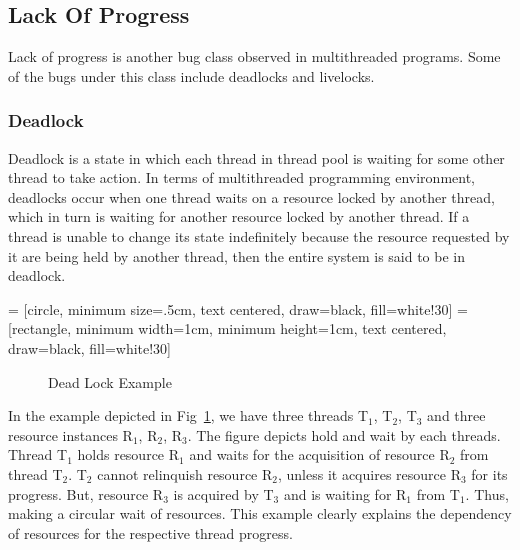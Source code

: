 \subsection{Lack Of Progress}

Lack of progress is another bug class observed in multithreaded programs. 
Some of the bugs under this class include deadlocks and livelocks. 

\subsubsection{Deadlock}

Deadlock is a state in which each thread in thread pool is waiting for some other thread to take action. 
In terms of multithreaded programming environment, deadlocks occur when one thread waits on a resource locked by another thread, which in turn is waiting for another resource locked by another thread. 
If a thread is unable to change its state indefinitely because the resource requested by it are being held by another thread, then the entire system is said to be in deadlock\cite{chaki2005concurrent}. 

 = [circle, minimum size=.5cm, text centered, draw=black, fill=white!30]
 = [rectangle, minimum width=1cm, minimum height=1cm, text centered, draw=black, fill=white!30]

\begin{figure}[h]
\centering
{}
\caption{Dead Lock Example}
\label{deadlock_example}
\end{figure}

In the example depicted in Fig~\ref{deadlock_example}, we have three threads T$_1$, T$_2$, T$_3$ and three resource instances R$_1$, R$_2$, R$_3$. 
The figure depicts hold and wait by each threads. 
Thread T$_1$ holds resource R$_1$ and waits for the acquisition of resource R$_2$ from thread T$_2$. 
T$_2$ cannot relinquish resource R$_2$, unless it acquires resource R$_3$ for its progress. 
But, resource R$_3$ is acquired by T$_3$ and is waiting for R$_1$ from T$_1$. 
Thus, making a circular wait of resources. 
This example clearly explains the dependency of resources for the respective thread progress. 

